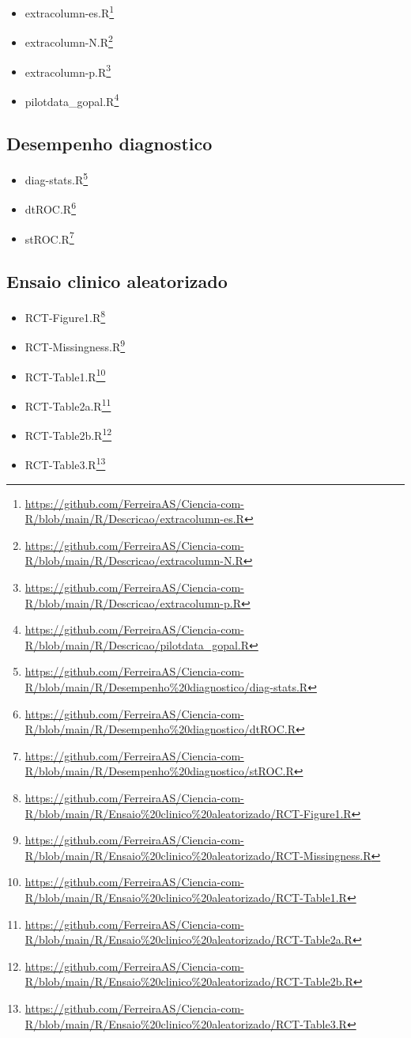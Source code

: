 \documentclass[
  a4paper,
]{book}
\renewcommand{\href}[2]{#2\footnote{\url{#1}}}
\begin{document}
\begin{itemize}
\item
  \href{https://github.com/FerreiraAS/Ciencia-com-R/blob/main/R/Descricao/extracolumn-es.R}{extracolumn-es.R}
\item
  \href{https://github.com/FerreiraAS/Ciencia-com-R/blob/main/R/Descricao/extracolumn-N.R}{extracolumn-N.R}
\item
  \href{https://github.com/FerreiraAS/Ciencia-com-R/blob/main/R/Descricao/extracolumn-p.R}{extracolumn-p.R}
\item
  \href{https://github.com/FerreiraAS/Ciencia-com-R/blob/main/R/Descricao/pilotdata_gopal.R}{pilotdata\_gopal.R}
\end{itemize}

\hypertarget{desempenho-diagnostico}{%
\subsection{Desempenho diagnostico}\label{desempenho-diagnostico}}

\begin{itemize}
\item
  \href{https://github.com/FerreiraAS/Ciencia-com-R/blob/main/R/Desempenho\%20diagnostico/diag-stats.R}{diag-stats.R}
\item
  \href{https://github.com/FerreiraAS/Ciencia-com-R/blob/main/R/Desempenho\%20diagnostico/dtROC.R}{dtROC.R}
\item
  \href{https://github.com/FerreiraAS/Ciencia-com-R/blob/main/R/Desempenho\%20diagnostico/stROC.R}{stROC.R}
\end{itemize}

\hypertarget{ensaio-clinico-aleatorizado}{%
\subsection{Ensaio clinico aleatorizado}\label{ensaio-clinico-aleatorizado}}

\begin{itemize}
\item
  \href{https://github.com/FerreiraAS/Ciencia-com-R/blob/main/R/Ensaio\%20clinico\%20aleatorizado/RCT-Figure1.R}{RCT-Figure1.R}
\item
  \href{https://github.com/FerreiraAS/Ciencia-com-R/blob/main/R/Ensaio\%20clinico\%20aleatorizado/RCT-Missingness.R}{RCT-Missingness.R}
\item
  \href{https://github.com/FerreiraAS/Ciencia-com-R/blob/main/R/Ensaio\%20clinico\%20aleatorizado/RCT-Table1.R}{RCT-Table1.R}
\item
  \href{https://github.com/FerreiraAS/Ciencia-com-R/blob/main/R/Ensaio\%20clinico\%20aleatorizado/RCT-Table2a.R}{RCT-Table2a.R}
\item
  \href{https://github.com/FerreiraAS/Ciencia-com-R/blob/main/R/Ensaio\%20clinico\%20aleatorizado/RCT-Table2b.R}{RCT-Table2b.R}
\item
  \href{https://github.com/FerreiraAS/Ciencia-com-R/blob/main/R/Ensaio\%20clinico\%20aleatorizado/RCT-Table3.R}{RCT-Table3.R}
\end{itemize}
\end{document}
